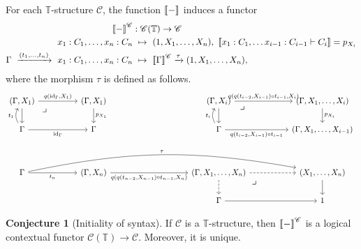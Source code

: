 \documentclass[10pt,letterpaper,cm]{nupset}
\theoremstyle{definition}
\theoremstyle{theorem}
\newtheorem{conj}[definition]{Conjecture}
\theoremstyle{remark}
\newcommand{\0}{\mathbf{0}}
\newcommand{\1}{\mathbf{1}}
\newcommand{\2}{\mathbf{2}}
\renewcommand{\c}{\mathscr{C}}
\newcommand{\T}{\mathbb T}
\DeclareMathOperator{\idd}{id}
\begin{document}
For each $\T$-structure $\c$, the function $\mleft\llbracket{-}\mright\rrbracket$ induces a functor 
\begin{align*}
\mleft\llbracket{-}\mright\rrbracket^{\c} & : \c(\T) \to \c
\\ x_1 : C_1, \ldots, x_n : C_n  & \ \mapsto \ \mleft(1, X_1, \ldots, X_n\mright), \ \mleft\llbracket{x_1 : C_1, \ldots x_{i-1} : C_{i-1} \vdash C_i}\mright\rrbracket = p_{X_i} 
\\ \Gamma \  \xrightarrow{\mleft(t_1, \ldots, t_n\mright)} \  x_1 : C_1, \ldots, x_n : C_n  & \ \mapsto \  \mleft\llbracket{\Gamma}\mright\rrbracket^{\c} \xrightarrow{\tau}  \mleft(1, X_1, \ldots, X_n\mright),
\end{align*} where the morphism $\tau$ is defined as follows.
\[
\begin{tikzcd}[column sep = huge]
	{\mleft(\Gamma, X_1\mright)} & {\mleft(\Gamma, X_1\mright)} && {\mleft(\Gamma, X_i\mright)} & {\mleft(\Gamma, X_1, \ldots, X_i\mright)} \\
	\Gamma & \Gamma && \Gamma & {\mleft(\Gamma, X_1, \ldots, X_{i-1}\mright)} \\
	\\
	\Gamma & {\mleft(\Gamma, X_n\mright)} && {\mleft(\Gamma, X_1, \ldots, X_n\mright)} & {\mleft(X_1, \ldots, X_n\mright)} \\
	&&& \Gamma & 1
	\arrow["{p_{X_1}}", from=1-2, to=2-2]
	\arrow["{\idd_{\Gamma}}"', from=2-1, to=2-2]
	\arrow[from=1-1, to=2-1]
	\arrow["{q(\idd_{\Gamma},X_1)}", from=1-1, to=1-2]
	\arrow["\scalebox{1.5}{\color{black}$\lrcorner$}"{anchor=center, pos=0.125}, draw=none, from=1-1, to=2-2]
	\arrow["{t_1}", bend left, from=2-1, to=1-1]
	\arrow[from=1-4, to=2-4]
	\arrow["{p_{X_i}}", from=1-5, to=2-5]
	\arrow["{q(t_{i-2}, X_{i-1}) \circ t_{i-1}}"', from=2-4, to=2-5]
	\arrow["{q( q(t_{i-2}, X_{i-1}) \circ t_{i-1} , X_i)}", from=1-4, to=1-5]
	\arrow["{t_i}", bend left, from=2-4, to=1-4]
	\arrow["\scalebox{1.5}{\color{black}$\lrcorner$}"{anchor=center, pos=0.125}, draw=none, from=1-4, to=2-5]
	\arrow[dashed, from=4-4, to=4-5]
	\arrow[from=4-5, to=5-5]
	\arrow[from=5-4, to=5-5]
	\arrow[dashed, from=4-4, to=5-4]
	\arrow["\scalebox{1.5}{\color{black}$\lrcorner$}"{anchor=center, pos=0.125}, draw=none, from=4-4, to=5-5]
	\arrow["{t_n}"', from=4-1, to=4-2]
	\arrow["{q( q(t_{n-2}, X_{n-1}) \circ t_{n-1} , X_n)}"', from=4-2, to=4-4]
	\arrow["\tau", bend left=11, from=4-1, to=4-5]
\end{tikzcd}
\]

\begin{conj}[Initiality of syntax]\label{initial}
If $\c$ is a $\T$-structure, then $\mleft\llbracket{-}\mright\rrbracket^{\c}$ is a logical contextual functor $\c(\T) \to \c$. Moreover, it is unique.
\end{conj}
\end{document}
